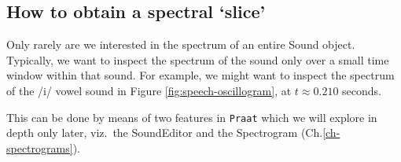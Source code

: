 \documentclass[
]{book}
\begin{document}
\label{box-praatspectralslice}
\subsection{How to obtain a spectral `slice'}\label{sec:spectralslice}

Only rarely are we interested in the spectrum of an entire Sound object. Typically, we want to inspect the spectrum of the sound only over a small time window within that sound. For example, we might want to inspect the spectrum of the /i/ vowel sound in Figure \ref{fig:speech-oscillogram}, at \(t \approx 0.210\) seconds.

This can be done by means of two features in \texttt{Praat} which we will explore in depth only later, viz.~the SoundEditor and the Spectrogram (Ch.\ref{ch-spectrograms}).
\end{document}
